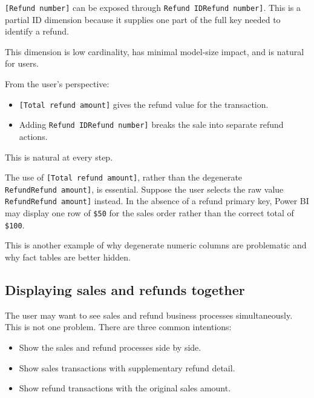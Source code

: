 \documentclass[10pt,openany,10pt]{book}
\providecommand{\tightlist}{%
  \setlength{\itemsep}{0pt}\setlength{\parskip}{0pt}}
\begin{document}
\texttt{{[}Refund\ number{]}} can be exposed through
\texttt{\textquotesingle{}Refund\ ID\textquotesingle{}{[}Refund\ number{]}}.
This is a partial ID dimension because it supplies one part of the full
key needed to identify a refund.

This dimension is low cardinality, has minimal model-size impact, and is
natural for users.

From the user's perspective:

\begin{itemize}
\tightlist
\item
  \texttt{{[}Total\ refund\ amount{]}} gives the refund value for the
  transaction.
\item
  Adding
  \texttt{\textquotesingle{}Refund\ ID\textquotesingle{}{[}Refund\ number{]}}
  breaks the sale into separate refund actions.
\end{itemize}

This is natural at every step.

The use of \texttt{{[}Total\ refund\ amount{]}}, rather than the
degenerate
\texttt{\textquotesingle{}Refund\textquotesingle{}{[}Refund\ amount{]}},
is essential. Suppose the user selects the raw value
\texttt{\textquotesingle{}Refund\textquotesingle{}{[}Refund\ amount{]}}
instead. In the absence of a refund primary key, Power BI may display
one row of \texttt{\$50} for the sales order rather than the correct
total of \texttt{\$100}.

This is another example of why degenerate numeric columns are
problematic and why fact tables are better hidden.

\subsection{Displaying sales and refunds
together}\label{displaying-sales-and-refunds-together}

The user may want to see sales and refund business processes
simultaneously. This is not one problem. There are three common
intentions:

\begin{itemize}
\tightlist
\item
  Show the sales and refund processes side by side.
\item
  Show sales transactions with supplementary refund detail.
\item
  Show refund transactions with the original sales amount.
\end{itemize}
\end{document}
